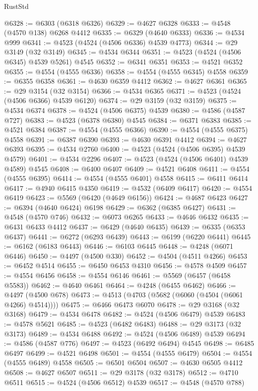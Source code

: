 \begin{lexlean}{RustStd}
\begin{coremodule}
@6328 := @6303 (@6318 @6326)
@6329 := @4627 @6328
@6333 := @4548 (@4570 @138) @6268 @4412
@6335 := @6329 (@4640 @6333)
@6336 := @4534 @999
@6341 := @4523 (@4524 (@4506 @6336) @4539 @4773)
@6344 := @29 @3149 (@32 @3149)
@6345 := @4534 @6344
@6351 := @4523 (@4524 (@4506 @6345) @4539 @5261) @4545
@6352 := @6341 @6351
@6353 := @4521 @6352
@6355 := @4554 (@4555 @6336)
@6358 := @4554 (@4555 @6345) @4558
@6359 := @6355 @6358
@6361 := @4630 @6359 @4412
@6362 := @4627 @6361
@6365 := @29 @3154 (@32 @3154)
@6366 := @4534 @6365
@6371 := @4523 (@4524 (@4506 @6366) @4539 @6120)
@6374 := @29 @3159 (@32 @3159)
@6375 := @4534 @6374
@6378 := @4524 (@4506 @6375) @4539
@6380 := @4586 (@4587 @727)
@6383 := @4523 (@6378 @6380) @4545
@6384 := @6371 @6383
@6385 := @4521 @6384
@6387 := @4554 (@4555 @6366)
@6390 := @4554 (@4555 @6375) @4558
@6391 := @6387 @6390
@6393 := @4630 @6391 @4412
@6394 := @4627 @6393
@6395 := @4534 @2760
@6400 := @4523 (@4524 (@4506 @6395) @4539 @4579)
@6401 := @4534 @2296
@6407 := @4523 (@4524 (@4506 @6401) @4539 @4589) @4545
@6408 := @6400 @6407
@6409 := @4521 @6408
@6411 := @4554 (@4555 @6395)
@6414 := @4554 (@4555 @6401) @4558
@6415 := @6411 @6414
@6417 := @4940 @6415 @4350
@6419 := @4532 (@6409 @6417)
@6420 := @4554 @6419
@6423 := @5569 (@6420 (@4649 @6156))
@6424 := @4687 @6423
@6427 := @6394 (@4640 @6424) @6198
@6429 := @6362 (@6385 @6427)
@6431 := @4548 (@4570 @746)
@6432 := @6073 @6265
@6433 := @4646 @6432
@6435 := @6431 @6433 @4412
@6437 := @6429 (@4640 @6435)
@6439 := @6335 (@6353 @6437)
@6441 := @6272 (@6293 @6439)
@6443 := @6199 (@6220 @6441)
@6445 := @6162 (@6183 @6443)
@6446 := @6103 @6445
@6448 := @4248 (@6071 @6446)
@6450 := @4497 (@4500 @330)
@6452 := @4504 (@4511 @4266)
@6453 := @6452 @4514
@6455 := @6450 @6453 @4310
@6456 := @4578 @4509
@6457 := @4554 @6456
@6458 := @4554 @6146
@6461 := @5569 (@6457 (@6458 @5583))
@6462 := @4640 @6461
@6464 := @4248 (@6455 @6462)
@6466 := @4497 (@4500 @678)
@6473 := @4513 (@4703 (@5682 (@6060 (@4504 (@6061 @4266) @4514))))
@6475 := @6466 @6473 @6070
@6478 := @29 @3168 (@32 @3168)
@6479 := @4534 @6478
@6482 := @4524 (@4506 @6479) @4539
@6483 := @4578 @5621
@6485 := @4523 (@6482 @6483)
@6488 := @29 @3173 (@32 @3173)
@6489 := @4534 @6488
@6492 := @4524 (@4506 @6489) @4539
@6494 := @4586 (@4587 @776)
@6497 := @4523 (@6492 @6494) @4545
@6498 := @6485 @6497
@6499 := @4521 @6498
@6501 := @4554 (@4555 @6479)
@6504 := @4554 (@4555 @6489) @4558
@6505 := @6501 @6504
@6507 := @4630 @6505 @4412
@6508 := @4627 @6507
@6511 := @29 @3178 (@32 @3178)
@6512 := @4710 @6511
@6515 := @4524 (@4506 @6512) @4539
@6517 := @4548 (@4570 @788)

\end{coremodule}
\end{lexlean}
